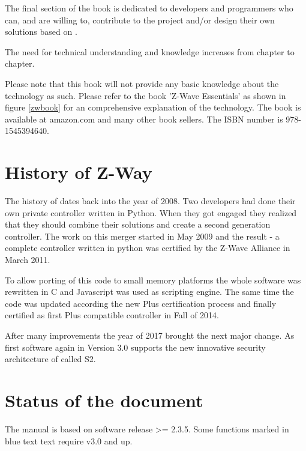 The final section of the book is dedicated to developers and programmers who can, and are 
willing to, contribute to the project and/or design their own solutions based on \zway.

The need for technical understanding and knowledge increases from chapter to chapter.

Please note that this book will not provide any basic knowledge about the \zwave technology
as such. Please
refer to the book 'Z-Wave Essentials' as shown in figure \ref{zwbook} for an comprehensive
explanation of the \zwave technology. The book is available at amazon.com and many other 
book sellers. The ISBN number is 978-1545394640.


\section{History of Z-Way}

The history of \zway dates back into the year of 2008. Two developers had done their own
private \zwave controller written in Python. When they got engaged they realized that
they should combine their solutions and create a second generation \zwave controller.
The work on this merger started in May 2009 and the result - a complete \zwave controller 
written in python was certified by the Z-Wave Alliance in March 2011.


To allow porting of this code to small memory platforms the whole software was rewritten
in C and Javascript was used as scripting engine. The same time the code was updated according 
the new \zwave Plus certification process and finally certified as first \zwave Plus 
compatible controller in Fall of 2014.
 
 
After many improvements the year of 2017 brought the next major change. As first software 
again \zway in Version 3.0 supports the new innovative security architecture of \zwave 
called S2.

\section{Status of the document}

The manual is based on \zway software release >= 2.3.5. Some functions marked in blue text
text require \zway v3.0 and up.
